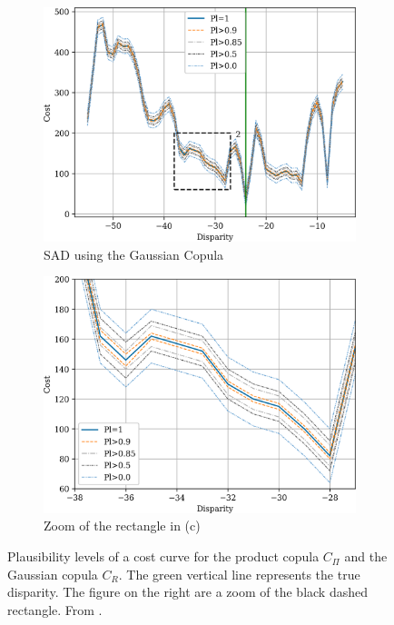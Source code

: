 \begin{figure}
    \begin{subfigure}{0.48\linewidth}
        \centering
        \includegraphics[width=\linewidth]{Images/Chap_4/bel_100_120.png}
        \caption{SAD using the Gaussian Copula}
        \label{fig:belief_gaussian}
    \end{subfigure}\hfill
    \begin{subfigure}{0.48\linewidth}
        \centering
        \includegraphics[width=\linewidth]{Images/Chap_4/bel_100_120_zoom.png}
        \caption{Zoom of the rectangle in (c)}
        \label{fig:belief_gaussian_zoom}
    \end{subfigure}
    \caption{Plausibility levels of a cost curve for the product copula $C_\Pi$ and the Gaussian copula $C_R$. The green vertical line represents the true disparity. The figure on the right are a zoom of the black dashed rectangle. From \cite{malinowski_uncertainty_2024}.}
    \label{fig:belief_curves}
\end{figure}

